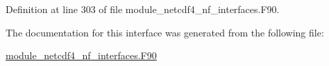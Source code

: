 Definition at line 303 of file module\+\_\+netcdf4\+\_\+nf\+\_\+interfaces.\+F90.



The documentation for this interface was generated from the following file\+:\begin{DoxyCompactItemize}
\item 
\hyperlink{module__netcdf4__nf__interfaces_8F90}{module\+\_\+netcdf4\+\_\+nf\+\_\+interfaces.\+F90}\end{DoxyCompactItemize}
